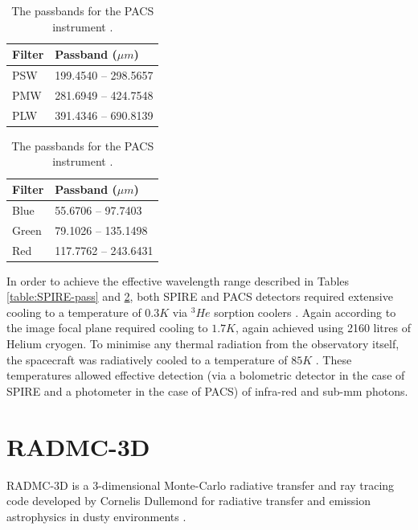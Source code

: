 \documentclass{report}
\begin{document}
\begin{table}[h]
  \captionsetup{width=0.3\textwidth}
  \parbox{.4\linewidth}{
  \centering
  \begin{tabular}{||l l||}
  \hline
  Filter & Passband ($\mu m$) \\ [0.5ex]
  \hline\hline
  PSW    &    199.4540 --	298.5657   \\
  \hline
  PMW    &    281.6949 --	424.7548   \\
  \hline
  PLW    &    391.4346 --	690.8139   \\ [1ex]
  \hline
  \end{tabular}
  \caption{\protect The passbands (for extended source) for the SPIRE instrument \parencite{pass}.}
  \label{table:SPIRE-pass}
  }
  \parbox{.4\linewidth}{
  \centering
  \begin{tabular}{||l l||}
  \hline
  Filter & Passband ($\mu m$) \\ [0.5ex]
  \hline\hline
  Blue   &    55.6706 -- 97.7403       \\
  \hline
  Green  &    79.1026 --	135.1498     \\
  \hline
  Red    &    117.7762 --	243.6431     \\ [1ex]
  \hline
  \end{tabular}
  \caption{\protect The passbands for the PACS instrument \parencite{pass}.}
  \label{table:PACS-pass}
  }
\end{table}

In order to achieve the effective wavelength range described in Tables \ref{table:SPIRE-pass} and \ref{table:PACS-pass}, both SPIRE and PACS detectors required extensive cooling to a temperature of $0.3 K$ via $^{3}{He}$ sorption coolers \parencite{herschel}. Again according to \textcite{herschel} the image focal plane required cooling to $1.7 K$, again achieved using 2160 litres of Helium cryogen. To minimise any thermal radiation from the observatory itself, the spacecraft was radiatively cooled to a temperature of $85 K$ \parencite{herschel}. These temperatures allowed effective detection (via a bolometric detector in the case of SPIRE and a photometer in the case of PACS) of infra-red and sub-mm photons.

\section{RADMC-3D} \label{radmc}
RADMC-3D is a 3-dimensional Monte-Carlo radiative transfer and ray tracing code developed by Cornelis Dullemond for radiative transfer and emission astrophysics in dusty environments \parencite{RADMC-3D}.
\end{document}
